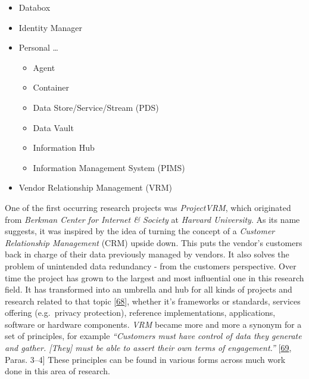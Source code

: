 \documentclass[12pt,english,a4paper,titlepage,cleardoublepage=empty,dottedtoc]{report}
\providecommand{\tightlist}{%
  \setlength{\itemsep}{0pt}\setlength{\parskip}{0pt}}
\begin{document}
\begin{itemize}
\tightlist
\item
  Databox
\item
  Identity Manager
\item
  Personal \ldots{}

  \begin{itemize}
  \tightlist
  \item
    Agent
  \item
    Container
  \item
    Data Store/Service/Stream (PDS)
  \item
    Data Vault
  \item
    Information Hub
  \item
    Information Management System (PIMS)
  \end{itemize}
\item
  Vendor Relationship Management (VRM)
\end{itemize}

One of the first occurring research projects was \emph{ProjectVRM},
which originated from \emph{Berkman Center for Internet \& Society} at
\emph{Harvard University}. As its name suggests, it was inspired by the
idea of turning the concept of a \emph{Customer Relationship Management}
(CRM) upside down. This puts the vendor's customers back in charge of
their data previously managed by vendors. It also solves the problem of
unintended data redundancy - from the customers perspective. Over time
the project has grown to the largest and most influential one in this
research field. It has transformed into an umbrella and hub for all
kinds of projects and research related to that topic
{[}\protect\hyperlink{ref-web_2016_projectvrm_development-work}{68}{]},
whether it's frameworks or standards, services offering (e.g.~privacy
protection), reference implementations, applications, software or
hardware components. \emph{VRM} became more and more a synonym for a set
of principles, for example \emph{``Customers must have control of data
they generate and gather. {[}They{]} must be able to assert their own
terms of engagement.''}
{[}\protect\hyperlink{ref-web_2016_projectvrm_principles}{69}, Paras.
3--4{]} These principles can be found in various forms across much work
done in this area of research.
\end{document}
